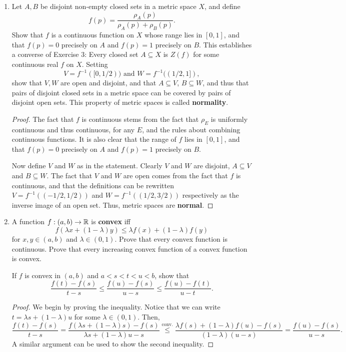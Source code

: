\begin{enumerate}
\item %
Let $A, B$ be disjoint non-empty closed sets in a metric space $X$, and define
\[
    f(p) = \frac{\rho_A(p)}{\rho_A(p) + \rho_B(p)}.
\]
Show that $f$ is a continuous function on $X$ whose range lies in $[0, 1]$, and that $f(p) = 0$ precisely on $A$ and $f(p) = 1$ precisely on $B$. This establishes a converse of Exercise 3: Every closed set $A \subseteq X$ is $Z(f)$ for some continuous real $f$ on $X$. Setting 
\[
    V = f^{-1}([0, 1/2)) \text{ and } W = f^{-1}((1/2, 1]),
\]
show that $V, W$ are open and disjoint, and that $A \subseteq V$, $B \subseteq W$, and thus that pairs of disjoint closed sets in a metric space can be covered by pairs of disjoint open sets. This property of metric spaces is called \textbf{normality}.

\begin{proof}
    The fact that $f$ is continuous stems from the fact that $\rho_E$ is uniformly continuous and thus continuous, for any $E$, and the rules about combining continuous functions. It is also clear that the range of $f$ lies in $[0, 1]$, and that $f(p) = 0$ precisely on $A$ and $f(p) = 1$ precisely on $B$.

    Now define $V$ and $W$ as in the statement. Clearly $V$ and $W$ are disjoint, $A \subseteq V$ and $B \subseteq W$. The fact that $V$ and $W$ are open comes from the fact that $f$ is continuous, and that the definitions can be rewritten $V = f^{-1}((-1/2, 1/2))$ and $W = f^{-1}((1/2, 3/2))$ respectively as the inverse image of an open set. Thus, metric spaces are \textbf{normal}.
\end{proof}

\item %
A function $f: (a, b) \rightarrow \mathbb{R}$ is \textbf{convex} iff
\[
    f(\lambda x + (1 - \lambda) y) \le \lambda f(x) + (1 - \lambda) f(y)
\]
for $x, y \in (a, b)$ and $\lambda \in (0, 1)$. Prove that every convex function is continuous. Prove that every increasing convex function of a convex function is convex.

If $f$ is convex in $(a, b)$ and $a < s < t < u < b$, show that
\[
    \frac{f(t) - f(s)}{t - s} \le \frac{f(u) - f(s)}{u - s} \le \frac{f(u) - f(t)}{u - t}.
\]

\begin{proof}
    We begin by proving the inequality. Notice that we can write $t = \lambda s + (1 - \lambda) u$ for some $\lambda \in (0, 1)$. Then,
\[
    \frac{f(t) - f(s)}{t - s} = \frac{f(\lambda s + (1 - \lambda) s) - f(s)}{\lambda s + (1 - \lambda) u - s} \overset{\text{conv.}}{\le} \frac{\lambda f(s) + (1 - \lambda) f(u) - f(s)}{(1 - \lambda)(u - s)} = \frac{f(u) - f(s)}{u - s}.
\]
A similar argument can be used to show the second inequality. \TODO 
\end{proof}


\end{enumerate}
